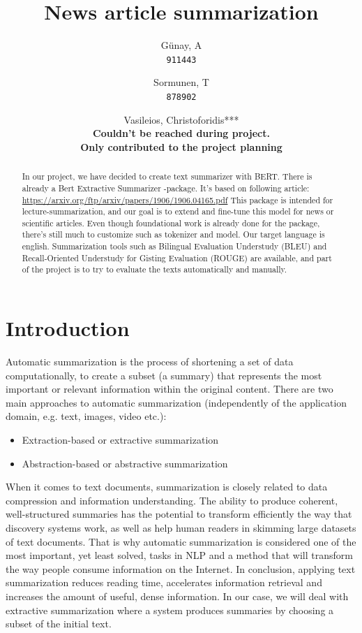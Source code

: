 \documentclass{article}
\title{News article summarization}
\author{
  Günay, A\\
  \texttt{911443}
  \and
  Sormunen, T\\
  \texttt{878902}
  \and
  Vasileios, Christoforidis***\\
  \textbf{Couldn't be reached during project.\\ Only contributed to the project planning}
}
\begin{document}
	
\maketitle

\begin{abstract}
	\noindent
	In our project, we have decided to create text summarizer with BERT. 
	There is already a Bert Extractive Summarizer -package. It's based on following article: \href{https://arxiv.org/ftp/arxiv/papers/1906/1906.04165.pdf}{https://arxiv.org/ftp/arxiv/papers/1906/1906.04165.pdf}
	This package is intended for lecture-summarization, and our goal is to extend and fine-tune this model for news or scientific articles.
	Even though foundational work is already done for the package, there's still much to customize such as tokenizer and model. 
	Our target language is english. Summarization tools such as Bilingual Evaluation Understudy (BLEU) and Recall-Oriented Understudy for Gisting Evaluation (ROUGE) are available, and part of the project is to try to evaluate the texts automatically and manually.	
\end{abstract}

\clearpage
\section{Introduction}

Automatic summarization is the process of shortening a set of data computationally, to create a subset (a summary) that represents the most important or relevant information within the original content. There are two main approaches to automatic summarization (independently of the application domain, e.g. text, images, video etc.):
\begin{itemize}
	\item Extraction-based or extractive summarization 
	\item Abstraction-based or abstractive summarization
\end{itemize}

When it comes to text documents, summarization is closely related to data compression and information understanding. The ability to produce coherent, well-structured summaries has the potential to transform efficiently the way that discovery systems work, as well as help human readers in skimming large datasets of text documents. That is why automatic summarization is considered one of the most important, yet least solved, tasks in NLP and a method that will transform the way people consume information on the Internet. In conclusion, applying text summarization reduces reading time, accelerates information retrieval and increases the amount of useful, dense information. In our case, we will deal with extractive summarization where a system produces summaries by choosing a subset of the initial text.
\end{document}
